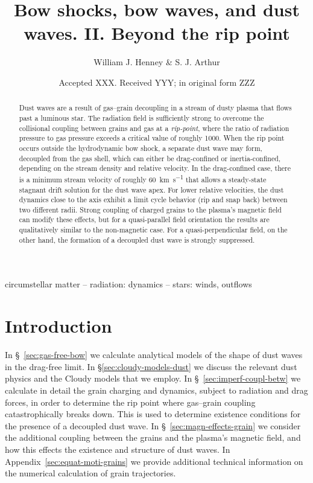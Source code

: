 \documentclass[useAMS, usenatbib, a4paper]{mnras}
\title
{Bow shocks, bow waves, and dust waves. II. Beyond the rip point}
\author[Henney \& Arthur]{
  William J. Henney \& S. J. Arthur\\
  \AddressCRyA
}
\date{Accepted XXX. Received YYY; in original form ZZZ}
\begin{document}
\label{firstpage}
\pagerange{\pageref{firstpage}--\pageref{lastpage}}
\maketitle
\begin{abstract}
  Dust waves are a result of gas--grain decoupling in a stream of
  dusty plasma that flows past a luminous star.  The radiation field
  is sufficiently strong to overcome the collisional coupling between
  grains and gas at a \textit{rip-point}, where the ratio of radiation
  pressure to gas pressure exceeds a critical value of roughly 1000.
  When the rip point occurs outside the hydrodynamic bow shock, a
  separate dust wave may form, decoupled from the gas shell, which can
  either be drag-confined or inertia-confined, depending on the stream
  density and relative velocity.  In the drag-confined case, there is
  a minimum stream velocity of roughly \SI{60}{km.s^{-1}} that allows
  a steady-state stagnant drift solution for the dust wave apex.  For
  lower relative velocities, the dust dynamics close to the axis
  exhibit a limit cycle behavior (rip and snap back) between two
  different radii.  Strong coupling of charged grains to the plasma's
  magnetic field can modify these effects, but for a quasi-parallel
  field orientation the results are qualitatively similar to the
  non-magnetic case. For a quasi-perpendicular field, on the other
  hand, the formation of a decoupled dust wave is strongly suppressed.
\end{abstract}

\begin{keywords}
  circumstellar matter -- radiation: dynamics -- stars: winds, outflows
\end{keywords}


\section{Introduction}
\label{sec:rip-introduction}

In \S~\ref{sec:gas-free-bow} we calculate analytical
models of the shape of dust waves in the drag-free limit.
%
In \S\ref{sec:cloudy-models-dust} we discuss the relevant dust physics
and the Cloudy models that we employ.
%
In \S~\ref{sec:imperf-coupl-betw} we calculate in detail the grain
charging and dynamics, subject to radiation and drag forces, in order
to determine the rip point where gas--grain coupling catastrophically
breaks down.  This is used to determine existence conditions for the
presence of a decoupled dust wave.
%
In \S~\ref{sec:magn-effects-grain} we consider the additional coupling
between the grains and the plasma's magnetic field, and how this
effects the existence and structure of dust waves.
%
In Appendix~\ref{sec:equat-moti-grains} we provide additional
technical information on the numerical calculation of grain
trajectories.
\end{document}
